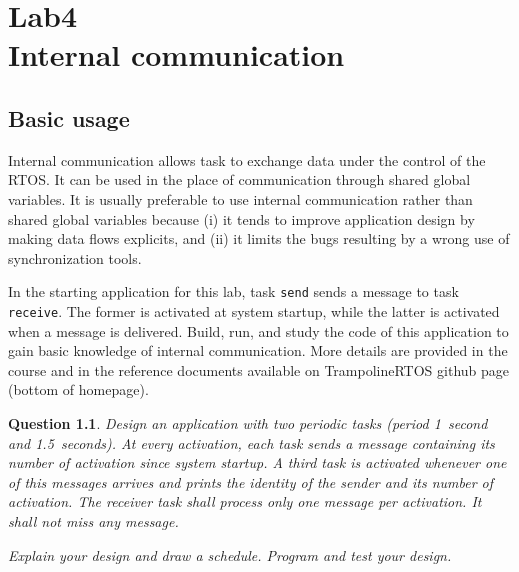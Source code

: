 \documentclass[11pt]{report}
\newtheorem{ex}{Question}
\begin{document}
%

\chapter{Lab4\\Internal communication}

\section{Basic usage}

Internal communication allows task to exchange data under the control of the RTOS.
It can be used in the place of communication through shared global variables.
It is usually preferable to use internal communication rather than shared global variables because (i) it tends to improve application design by making data flows explicits, and (ii) it limits the bugs resulting by a wrong use of synchronization tools.

In the starting application for this lab, task \verb|send| sends a message to task \verb|receive|.
The former is activated at system startup, while the latter is activated when a message is delivered.
Build, run, and study the code of this application to gain basic knowledge of internal communication.
More details are provided in the course and in the reference documents available on TrampolineRTOS github page (bottom of homepage).

\begin{ex}
  Design an application with two periodic tasks (period \SI{1}{second} and \SI{1.5}{seconds}). At every activation, each task sends a message containing its number of activation since system startup.
  A third task is activated whenever one of this messages arrives and prints the identity of the sender and its number of activation.
  The receiver task shall process only one message per activation.
  It shall not miss any message.

  Explain your design and draw a schedule. Program and test your design.
\end{ex}
\end{document}
